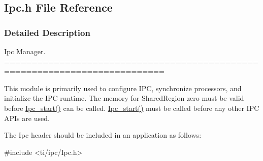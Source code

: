 \subsection{Ipc.h File Reference}
\label{_ipc_8h}


\subsubsection{Detailed Description}
Ipc Manager. ===========================================================================

This module is primarily used to configure IPC, synchronize processors, and initialize the IPC runtime. The memory for SharedRegion zero must be valid before \hyperlink{_ipc_8h_aca550c6a5498637cfec7b0f4e6d07828}{Ipc\_\-start()} can be called. \hyperlink{_ipc_8h_aca550c6a5498637cfec7b0f4e6d07828}{Ipc\_\-start()} must be called before any other IPC APIs are used.

The Ipc header should be included in an application as follows: 
\begin{DoxyCode}
  #include <ti/ipc/Ipc.h>
\end{DoxyCode}


